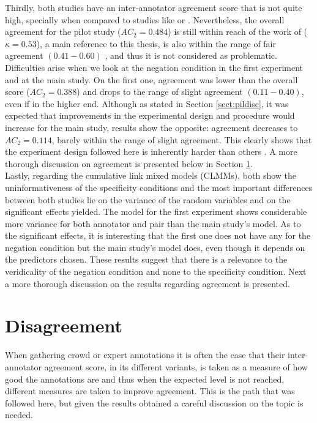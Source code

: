 Thirdly, both studies have an inter-annotator agreement score that is not quite high, specially when compared to studies like \citet{sauri2009factbank} or \citet{ross2019well}. Nevertheless, the overall agreement for the pilot study ($AC_2=0.484$) is still within reach of the work of \citet{de2012did} ($\kappa = 0.53$), a main reference to this thesis, is also within the range of fair agreement $(0.41-0.60)$ \citep{shrout1998measurement}, and thus it is not considered as problematic. Difficulties arise when we look at the negation condition in the first experiment and at the main study. On the first one, agreement was lower than the overall score ($AC_2=0.388$) and drops to the range of slight agreement $(0.11-0.40)$, even if in the higher end. Although as stated in Section \ref{sect:pildisc}, it was expected that improvements in the experimental design and procedure would increase for the main study, results show the opposite: agreement decreases to $AC_2=0.114$, barely within the range of slight agreement. This clearly shows that the experiment design followed here is inherently harder than others \citep{pavlick2019inherent}. A more thorough discussion on agreement is presented below in Section \ref{sect:dis}.\\

Lastly, regarding the cumulative link mixed models (CLMMs), both show the uninformativeness of the specificity conditions and the most important differences between both studies lie on the variance of the random variables and on the significant effects yielded. The model for the first experiment shows considerable more variance for both annotator and pair than the main study's model. As to the significant effects, it is interesting that the first one does not have any for the negation condition but the main study's model does, even though it depends on the predictors chosen. These results suggest that there is a relevance to the veridicality of the negation condition and none to the specificity condition. Next a more thorough discussion on the results regarding agreement is presented.\\

\section{Disagreement}\label{sect:dis}
When gathering crowd or expert annotations it is often the case that their inter-annotator agreement score, in its different variants, is taken as a measure of how good the annotations are and thus when the expected level is not reached, different measures are taken to improve agreement. This is the path that was followed here, but given the results obtained a careful discussion on the topic is needed.\\

